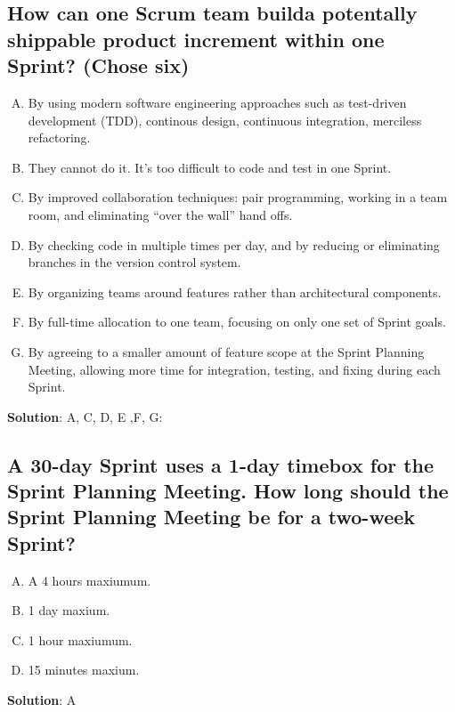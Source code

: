 \subsection{How can one Scrum team builda potentally shippable product increment within one Sprint? (Chose six)}
\begin{enumerate}[A)]
  \item By using modern software engineering approaches such as test-driven development (TDD), continous design, continuous integration, merciless refactoring.
  \item They cannot do it. It's too difficult to code and test in one Sprint.
  \item By improved collaboration techniques: pair programming, working in a team room, and eliminating \enquote{over the wall} hand offs.
  \item By checking code in multiple times per day, and by reducing or eliminating branches in the version control system.
  \item By organizing teams around features rather than architectural components.
  \item By full-time allocation to one team, focusing on only one set of Sprint goals.
  \item By agreeing to a smaller amount of feature scope at the Sprint Planning Meeting, allowing more time for integration, testing, and fixing during each Sprint.
\end{enumerate}


\textbf{Solution}: A, C, D, E ,F, G:


\subsection{A 30-day Sprint uses a 1-day timebox for the Sprint Planning Meeting. How long should the Sprint Planning Meeting be for a two-week Sprint?}
\begin{enumerate}[A)]
  \item A 4 hours maxiumum.
  \item 1 day maxium.
  \item 1 hour maxiumum.
  \item 15 minutes maxium.
\end{enumerate}


\textbf{Solution}: A


